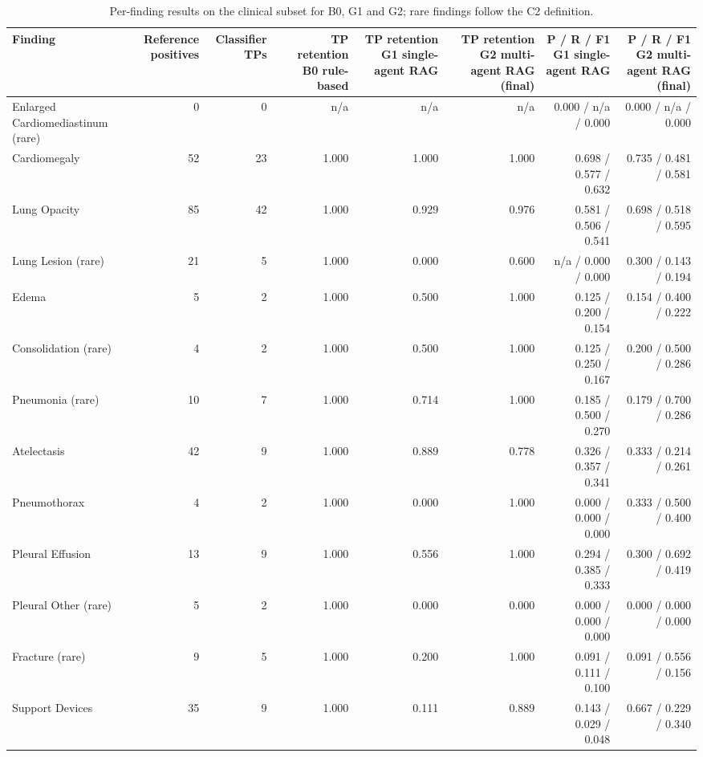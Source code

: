 \begin{table}[t]
\centering
\scriptsize
\begin{tabular}{lrrrrrrr}
\hline
Finding & Reference positives & Classifier TPs & TP retention B0 rule-based & TP retention G1 single-agent RAG & TP retention G2 multi-agent RAG (final) & P / R / F1 G1 single-agent RAG & P / R / F1 G2 multi-agent RAG (final) \\
\hline
Enlarged Cardiomediastinum (rare) & 0 & 0 & n/a & n/a & n/a & 0.000 / n/a / 0.000 & 0.000 / n/a / 0.000 \\
Cardiomegaly & 52 & 23 & 1.000 & 1.000 & 1.000 & 0.698 / 0.577 / 0.632 & 0.735 / 0.481 / 0.581 \\
Lung Opacity & 85 & 42 & 1.000 & 0.929 & 0.976 & 0.581 / 0.506 / 0.541 & 0.698 / 0.518 / 0.595 \\
Lung Lesion (rare) & 21 & 5 & 1.000 & 0.000 & 0.600 & n/a / 0.000 / 0.000 & 0.300 / 0.143 / 0.194 \\
Edema & 5 & 2 & 1.000 & 0.500 & 1.000 & 0.125 / 0.200 / 0.154 & 0.154 / 0.400 / 0.222 \\
Consolidation (rare) & 4 & 2 & 1.000 & 0.500 & 1.000 & 0.125 / 0.250 / 0.167 & 0.200 / 0.500 / 0.286 \\
Pneumonia (rare) & 10 & 7 & 1.000 & 0.714 & 1.000 & 0.185 / 0.500 / 0.270 & 0.179 / 0.700 / 0.286 \\
Atelectasis & 42 & 9 & 1.000 & 0.889 & 0.778 & 0.326 / 0.357 / 0.341 & 0.333 / 0.214 / 0.261 \\
Pneumothorax & 4 & 2 & 1.000 & 0.000 & 1.000 & 0.000 / 0.000 / 0.000 & 0.333 / 0.500 / 0.400 \\
Pleural Effusion & 13 & 9 & 1.000 & 0.556 & 1.000 & 0.294 / 0.385 / 0.333 & 0.300 / 0.692 / 0.419 \\
Pleural Other (rare) & 5 & 2 & 1.000 & 0.000 & 0.000 & 0.000 / 0.000 / 0.000 & 0.000 / 0.000 / 0.000 \\
Fracture (rare) & 9 & 5 & 1.000 & 0.200 & 1.000 & 0.091 / 0.111 / 0.100 & 0.091 / 0.556 / 0.156 \\
Support Devices & 35 & 9 & 1.000 & 0.111 & 0.889 & 0.143 / 0.029 / 0.048 & 0.667 / 0.229 / 0.340 \\
\hline
\end{tabular}
\caption{Per-finding results on the clinical subset for B0, G1 and G2; rare findings follow the C2 definition.}
\label{tab:table6_per_finding_results}
\end{table}
